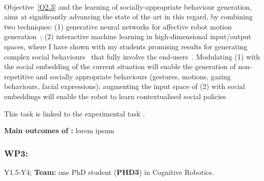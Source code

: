 \paragraph{\TBC}

Objective~\ref{O2.3} and the learning of socially-appropriate behaviour
generation, \project aims at significantly advancing the state of the art in
this regard, by combining two techniques: (1) generative neural networks
for affective robot motion
generation~\cite{marmpena2019generating,suguitan2020moveae}; (2) interactive
machine learning in high-dimensional input/output spaces, where I have shown
with my students promising results for generating complex social
behaviours~\cite{senft2019teaching, winkle2020couch} that fully involve the
end-users~\cite{winkle2018social}. Modulating (1) with the social embedding of
the current situation will enable the generation of non-repetitive and socially
appropriate behaviours (gestures, motions, gazing behaviours, facial
expressions); augmenting the input space of (2) with social embeddings will
enable the robot to learn contextualised social policies

This task is linked to the experimental task \tDD.

\begin{framed}
    {\noindent\bf Main outcomes of \tBB:} lorem ipsum 
\end{framed}


\subsubsection{WP3: \textbf{\WPC}}

\begin{framed}
 Y1.5-Y4; {\bf Team:} one PhD student ({\bf PHD3}) in Cognitive Robotics.
\end{framed}


